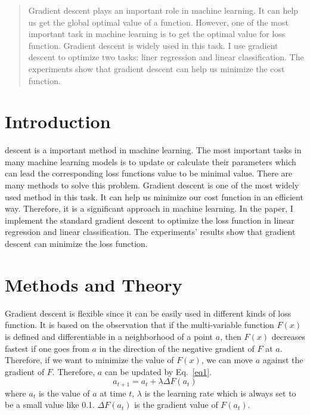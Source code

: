 \documentclass[journal, a4paper]{IEEEtran}
\begin{document}
\begin{abstract}
Gradient descent plays an important role in machine learning. It can help us get the global optimal value of a function. However, one of the most important task in machine learning is to get the optimal value for loss function. Gradient descent is widely used in this task. I use gradient descent to optimize two tasks: liner regression and linear classification. The experiments show that gradient descent can help us minimize the cost function.
\end{abstract}

\section{Introduction}
 descent is a important method in machine learning. The most important tasks in many machine learning models is to update or calculate their parameters which can lead the corresponding loss functions value to be minimal value. There are many methods to solve this problem. Gradient descent is one of the most widely used method in this task. It can help us minimize our cost function in an efficient way. Therefore, it is a significant approach in machine learning. In the paper, I implement the standard gradient descent to optimize the loss function in linear regression and linear classification. The experiments' results show that gradient descent can minimize the loss function.

\section{Methods and Theory}
Gradient descent is flexible since it can be easily used in different kinds of loss function. It is based on the observation that if the multi-variable function $F(x)$ is defined and differentiable in a neighborhood of a point $a$, then $F(x)$ decreases fastest if one goes from $a$ in the direction of the negative gradient of $F$ at $a$. Therefore, if we want to minimize the value of $F(x)$, we can move $a$ against the gradient of $F$. Therefore, $a$ can be updated by Eq.~\eqref{eq1}.
\begin{equation}
a_{t+1}=a_{t} + \lambda \Delta F(a_{t}) \label{eq1}
\end{equation}
where $a_{t}$ is the value of $a$ at time $t$, $\lambda$ is the learning rate which is always set to be a small value like 0.1. $\Delta F(a_{t})$ is the gradient value of $F(a_{t})$.
\end{document}
